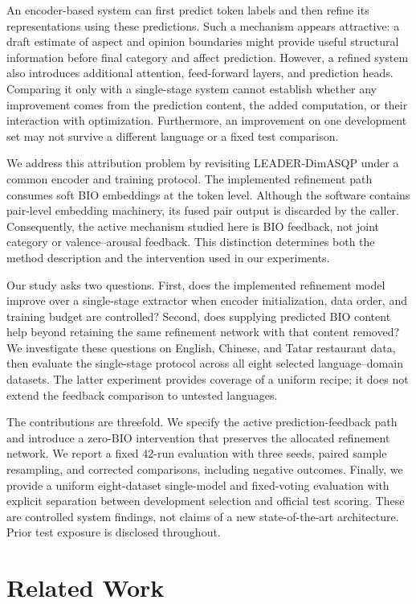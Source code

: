 \documentclass[conference]{IEEEtran}
\begin{document}
An encoder-based system can first predict token labels and then refine its representations using these predictions. Such a mechanism appears attractive: a draft estimate of aspect and opinion boundaries might provide useful structural information before final category and affect prediction. However, a refined system also introduces additional attention, feed-forward layers, and prediction heads. Comparing it only with a single-stage system cannot establish whether any improvement comes from the prediction content, the added computation, or their interaction with optimization. Furthermore, an improvement on one development set may not survive a different language or a fixed test comparison.

We address this attribution problem by revisiting LEADER-DimASQP under a common encoder and training protocol. The implemented refinement path consumes soft BIO embeddings at the token level. Although the software contains pair-level embedding machinery, its fused pair output is discarded by the caller. Consequently, the active mechanism studied here is BIO feedback, not joint category or valence--arousal feedback. This distinction determines both the method description and the intervention used in our experiments.

Our study asks two questions. First, does the implemented refinement model improve over a single-stage extractor when encoder initialization, data order, and training budget are controlled? Second, does supplying predicted BIO content help beyond retaining the same refinement network with that content removed? We investigate these questions on English, Chinese, and Tatar restaurant data, then evaluate the single-stage protocol across all eight selected language--domain datasets. The latter experiment provides coverage of a uniform recipe; it does not extend the feedback comparison to untested languages.

The contributions are threefold. We specify the active prediction-feedback path and introduce a zero-BIO intervention that preserves the allocated refinement network. We report a fixed 42-run evaluation with three seeds, paired sample resampling, and corrected comparisons, including negative outcomes. Finally, we provide a uniform eight-dataset single-model and fixed-voting evaluation with explicit separation between development selection and official test scoring. These are controlled system findings, not claims of a new state-of-the-art architecture. Prior test exposure is disclosed throughout.

\section{Related Work}
\end{document}
